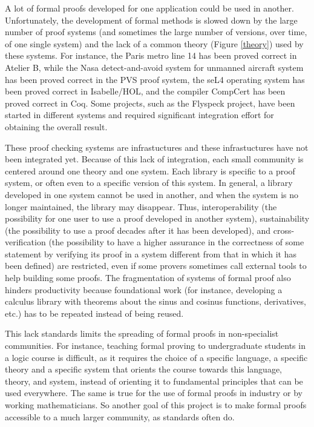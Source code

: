 A lot of formal proofs developed for one application could be used in
another.  Unfortunately, the development of formal methods is slowed
down by the large number of proof systems (and sometimes the large
number of versions, over time, of one single system) and the lack of a
common theory (Figure \ref{theory}) used by these systems.  For
instance, the Paris metro line 14 has been proved correct in {\sc
  Atelier B}, while the Nasa detect-and-avoid system for unmanned
aircraft system has been proved correct in the {\sc PVS} proof system,
the seL4 operating system has been proved correct in {\sc
  Isabelle/HOL}, and the compiler CompCert has been proved correct in
{\sc Coq}.  Some projects, such as the Flyspeck project, have been
started in different systems and required significant integration
effort for obtaining the overall result.

These proof checking systems are infrastuctures and these
infrastuctures have not been integrated yet.  Because of this lack of
integration, each small community is centered around one theory and
one system. Each library is specific to a proof system, or often even
to a specific version of this system. In general, a library developed
in one system cannot be used in another, and when the system is no
longer maintained, the library may disappear.  Thus, interoperability
(the possibility for one user to use a proof developed in another
system), sustainability (the possibility to use a proof decades after
it has been developed), and cross-verification (the possibility to
have a higher assurance in the correctness of some statement by
verifying its proof in a system different from that in which it has
been defined) are restricted, even if some provers sometimes call
external tools to help building some proofs. The fragmentation of
systems of formal proof also hinders productivity because foundational
work (for instance, developing a calculus library with theorems about
the sinus and cosinus functions, derivatives, etc.) has to be repeated
instead of being reused.

This lack standards limits the spreading of formal proofs in
non-specialist communities. For instance, teaching formal proving to
undergraduate students in a logic course is difficult, as it requires
the choice of a specific language, a specific theory and a specific
system that orients the course towards this language, theory, and
system, instead of orienting it to fundamental principles that can be
used everywhere. The same is true for the use of formal proofs in
industry or by working mathematicians. So another goal of this project
is to make formal proofs accessible to a much larger community, as
standards often do.

